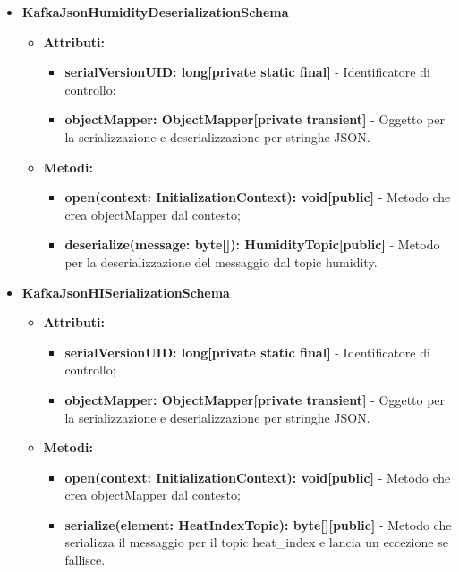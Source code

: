 \documentclass[8pt]{article}
\begin{document}
\begin{itemize}
\begin{itemize}
\begin{itemize}
        \end{itemize}
    \end{itemize}
    \item \textbf{KafkaJsonHumidityDeserializationSchema}
    \begin{itemize}
        \item \textbf{Attributi:}
        \begin{itemize}
            \item \textbf{serialVersionUID: long[private static final]} - Identificatore di controllo;
            \item \textbf{objectMapper: ObjectMapper[private transient]} - Oggetto per la serializzazione e deserializzazione per stringhe JSON.
        \end{itemize}
    \end{itemize}
    \begin{itemize}
        \item \textbf{Metodi:}
        \begin{itemize}
            \item \textbf{open(context: InitializationContext): void[public]} - Metodo che crea objectMapper dal contesto;
            \item \textbf{deserialize(message: byte[]): HumidityTopic[public]} - Metodo per la deserializzazione del messaggio dal topic humidity.
        \end{itemize}
    \end{itemize}
    \item \textbf{KafkaJsonHISerializationSchema}
    \begin{itemize}
        \item \textbf{Attributi:}
        \begin{itemize}
            \item \textbf{serialVersionUID: long[private static final]} - Identificatore di controllo;
            \item \textbf{objectMapper: ObjectMapper[private transient]} - Oggetto per la serializzazione e deserializzazione per stringhe JSON.
        \end{itemize}
    \end{itemize}
    \begin{itemize}
        \item \textbf{Metodi:}
        \begin{itemize}
            \item \textbf{open(context: InitializationContext): void[public]} - Metodo che crea objectMapper dal contesto;
            \item \textbf{serialize(element: HeatIndexTopic): byte[][public]} - Metodo che serializza il messaggio per il topic heat\_index e lancia un eccezione se fallisce.
        \end{itemize}
    \end{itemize}
\end{itemize}
\end{document}
